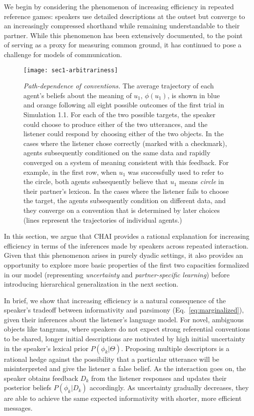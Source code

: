 We begin by considering the phenomenon of increasing efficiency in repeated reference games: speakers use detailed descriptions at the outset but converge to an increasingly compressed shorthand while remaining understandable to their partner.
While this phenomenon has been extensively documented, to the point of serving as a proxy for measuring common ground, it has continued to pose a challenge for models of communication.
 \begin{figure*}
	\centering
    \texttt{[image: sec1-arbitrariness]}
    \caption{\emph{Path-dependence of conventions.} The average trajectory of each agent's beliefs about the meaning of $u_1$, $\phi(u_1)$, is shown in blue and orange following all eight possible outcomes of the first trial in Simulation 1.1. For each of the two possible targets, the speaker could choose to produce either of the two utterances, and the listener could respond by choosing either of the two objects. In the cases where the listener chose correctly (marked with a checkmark), agents subsequently conditioned on the same data and rapidly converged on a system of meaning consistent with this feedback. For example, in the first row, when $u_1$ was successfully used to refer to the circle, both agents subsequently believe that $u_1$ means \emph{circle} in their partner's lexicon. In the cases where the listener fails to choose the target, the agents subsequently condition on different data, and they converge on a convention that is determined by later choices (lines represent the trajectories of individual agents.)}
  \label{fig:path-dependence}
\end{figure*}
In this section, we argue that CHAI provides a rational explanation for increasing efficiency in terms of the inferences made by speakers across repeated interaction.
Given that this phenomenon arises in purely dyadic settings, it also provides an opportunity to explore more basic properties of the first two capacities formalized in our model (representing \emph{uncertainty} and \emph{partner-specific learning}) before introducing hierarchical generalization in the next section. 

In brief, we show that increasing efficiency is a natural consequence of the speaker's tradeoff between informativity and parsimony (Eq.~\ref{eq:marginalized}), given their inferences about the listener's language model. 
For novel, ambiguous objects like tangrams, where speakers do not expect strong referential conventions to be shared, longer initial descriptions are motivated by high initial uncertainty in the speaker's lexical prior $P(\phi_k | \Theta)$. 
Proposing multiple descriptors is a rational hedge against the possibility that a particular utterance will be misinterpreted and give the listener a false belief.
As the interaction goes on, the speaker obtains feedback $D_k$ from the listener responses and updates their posterior beliefs $P(\phi_k | D_k)$ accordingly. 
As uncertainty gradually decreases, they are able to achieve the same expected informativity with shorter, more efficient messages. 



